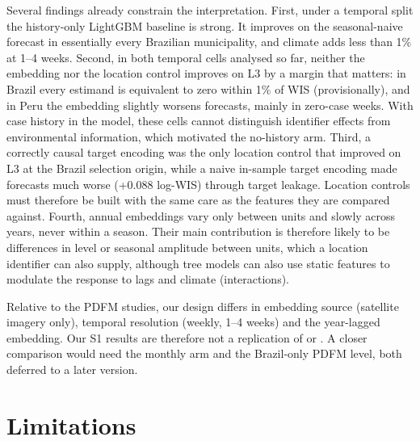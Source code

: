 \documentclass[11pt]{article}
\begin{document}
Several findings already constrain the interpretation. First, under a temporal split the
history-only LightGBM baseline is strong. It improves on the seasonal-naive forecast in essentially
every Brazilian municipality, and climate adds less than 1\% at 1--4 weeks. Second, in both temporal
cells analysed so far, neither the embedding nor the location control improves on L3 by a margin that
matters: in Brazil every estimand is equivalent to zero within 1\% of WIS (provisionally), and in Peru the
embedding slightly worsens forecasts, mainly in zero-case weeks. With case history in the model, these
cells cannot distinguish identifier effects from environmental information, which motivated the
no-history arm. Third, a correctly causal target encoding was the only location control that improved on
L3 at the Brazil selection origin, while a naive in-sample target encoding made forecasts much worse
(+0.088 log-WIS) through target leakage. Location controls must therefore be built with the same care as
the features they are compared against. Fourth, annual embeddings vary only between units and slowly
across years, never within a season. Their main contribution is therefore likely to be differences in
level or seasonal amplitude between units, which a location identifier can also supply, although tree
models can also use static features to modulate the response to lags and climate (interactions).

Relative to the PDFM studies, our design differs in embedding source (satellite imagery only),
temporal resolution (weekly, 1--4 weeks) and the year-lagged embedding. Our S1 results are therefore not a
replication of \citet{brittain2026foundation} or \citet{muslim2026planetary}. A closer comparison would
need the monthly arm and the Brazil-only PDFM level, both deferred to a later version.

\section{Limitations}
\label{sec:limitations}
\end{document}
